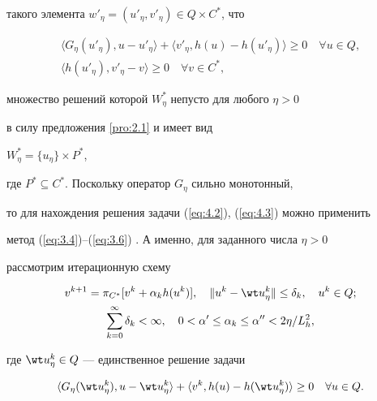 такого элемента $w'_{\eta}=(u'_{\eta} , v'_{\eta} ) \in Q \times C^*$, что 


\begin{gather} \label{eq:4.2} 


\langle G_{\eta} (u'_{\eta}), u-u'_{\eta}\rangle+


\langle v'_{\eta}, h(u) - h(u'_{\eta}) \rangle 


\geq 0 \quad \forall u \in Q, \\


%


\label{eq:4.3} 


\langle h(u'_{\eta}), v'_{\eta} - v \rangle \geq 0 \quad \forall v \in C^*, 


\end{gather}


множество решений которой $W^*_{\eta}$ непусто для любого $\eta > 0$ 


в силу предложения \ref{pro:2.1} и имеет вид


$W^*_{\eta}=\{u_{\eta}\} \times P^*$, 


где $P^* \subseteq C^*$. Поскольку оператор $G_{\eta} $ сильно монотонный, 


то для нахождения решения задачи (\ref{eq:4.2}), (\ref{eq:4.3}) можно применить 


метод (\ref{eq:3.4})--(\ref{eq:3.6}) . А именно, для заданного числа $\eta>0$ 


рассмотрим итерационную схему


\begin{gather} \label{eq:4.4} 


v^{k+1}=\pi_{C^*} [v^{k}+\alpha_{k} h(u^{k} )],\quad


\| u^{k} - \wt u^{k}_{\eta} \| 


\leq \delta_{k},\quad u^{k} \in Q; \\


%


\label{eq:4.5} 


\sum_{k=0}^{\infty} \delta_{k} < \infty,\quad


0 < \alpha' \leq \alpha_{k} \leq \alpha'' < 2\eta / L^2_{h}, 


\end{gather}


где $\wt u^{k}_{\eta} \in Q$ --- единственное решение задачи 


\begin{equation} \label{eq:4.6} 


\langle G_{\eta} (\wt u^{k}_{\eta}), u - \wt u^{k}_{\eta} \rangle 


+\langle v^{k} , h(u) - h(\wt u^{k}_{\eta}) \rangle 


\geq 0 \quad \forall u \in Q.


\end{equation}


